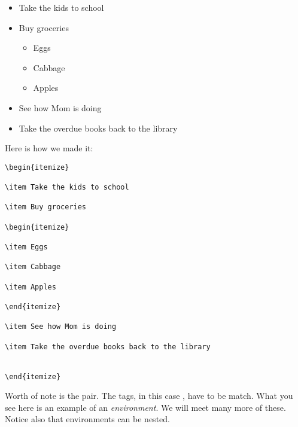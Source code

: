 \begin{itemize}

\item Take the kids to school

\item Buy groceries

\begin{itemize}

\item Eggs

\item Cabbage

\item Apples

\end{itemize}

\item See how Mom is doing

\item Take the overdue books back to the library



\end{itemize}

Here is how we made it:

\begin{verbatim}
\begin{itemize}

\item Take the kids to school

\item Buy groceries

\begin{itemize}

\item Eggs

\item Cabbage

\item Apples

\end{itemize}

\item See how Mom is doing

\item Take the overdue books back to the library


\end{itemize}
\end{verbatim}

Worth of note is the  pair.  The tags, in this case , have to be match.  What you see here is an example of an \emph{environment}.  We will meet many more of these.  Notice also that environments can be nested.

